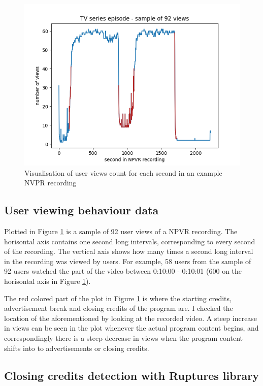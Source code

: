 \begin{figure}[H]
    \centering
    \includegraphics[width=1\textwidth]{../plots/episode.png}
    \caption{Visualisation of user views count for each second in an example NVPR recording}
    \label{fig:intro_ads_outro}
    \end{figure}

\subsection{User viewing behaviour data} \label{subsec:data}

Plotted in Figure \ref{fig:intro_ads_outro} is a sample of 92 user views of a NPVR recording. The horisontal axis contains one second long intervals, corresponding to every second of the recording. The vertical axis shows how many times a second long interval in the recording was viewed by users. For example, 58 users from the sample of 92 users watched the part of the video between 0:10:00 - 0:10:01 (600 on the horisontal axis in Figure \ref{fig:intro_ads_outro}).

The red colored part of the plot in Figure \ref{fig:intro_ads_outro} is where the starting credits, advertisement break and closing credits of the program are. I checked the location of the aforementioned by looking at the recorded video. A steep increase in views can be seen in the plot whenever the actual program content begins, and correspondingly there is a steep decrease in views when the program content shifts into to advertisements or closing credits.

\subsection{Closing credits detection with Ruptures library} \label{subsec:solution}

